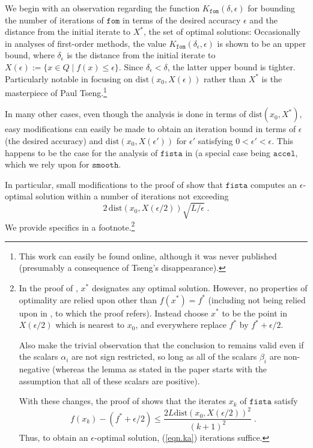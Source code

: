 \documentclass[reqno, 11pt]{amsart}
\numberwithin{equation}{section}
\newcommand{\fom}{\mathtt{fom}}
\newcommand{\accel}{\mathtt{accel}}
\newcommand{\fista}{\mathtt{fista}}
\newcommand{\smooth}{\mathtt{smooth}}
\newcommand{\dist}{\mathrm{dist}}
\begin{document}
We begin with an observation regarding the function $ K_{\fom}(\delta, \epsilon) $ for bounding the number of iterations of $ \fom $ in terms of the desired accuracy $ \epsilon $ and the distance from the initial iterate to $ X^* $, the set of optimal solutions:  Occasionally  in  analyses of first-order methods, the value $ K_{\fom}( \delta_{\epsilon}, \epsilon) $ is shown to be an upper bound, where $ \delta_{\epsilon} $ is the distance from the initial iterate to $ X(\epsilon) := \{ x \in Q \mid f(x) \leq \epsilon \} $. Since $ \delta_{\epsilon} < \delta $, the latter upper bound is tighter.  Particularly notable in focusing on $ \dist(x_0,X(\epsilon)) $ rather than $ X^* $   is the masterpiece \cite{tseng2008accelerated} of Paul Tseng.\footnote{This work can easily be found online, although it was never published (presumably a consequence of Tseng's disappearance).}

In many other cases, even though the analysis is done in terms of $ \dist(x_0,X^*) $, easy modifications can easily be made to obtain an iteration bound in terms of $ \epsilon $ (the desired accuracy) and $ \dist(x_0, X( \epsilon')) $ for $ \epsilon' $ satisfying $ 0 < \epsilon' < \epsilon $. This happens to be the case for the analysis of $ \fista $ in \cite{beck2009fast}  (a special case being $ \accel $, which we rely upon for $ \smooth $. 

In particular, small modifications to the proof of \cite[Thm 4.4]{beck2009fast} show that $ \fista $ computes an $ \epsilon $-optimal solution within a number of iterations not exceeding
\begin{equation}  \label{eqn.ka} 
                      2 \, \dist(x_0,X(\epsilon/2)) \sqrt{L/ \epsilon } \; . 
\end{equation}
We provide specifics in a footnote.\footnote{In the proof of \cite[Thm 4.4]{beck2009fast}, $ x^* $  designates any optimal solution.  However, no properties of optimality are relied upon other than $ f(x^*) = f^* $ (including not being relied upon in \cite[Lemma 4.1]{beck2009fast}, to which the proof refers). Instead choose $ x^* $ to be the point in $ X(\epsilon/2) $ which is nearest to $ x_0 $, and everywhere replace $ f^* $ by $  f^* + \epsilon/ 2 $. 

Also make the trivial observation that the conclusion to \cite[Lemma 4.2]{beck2009fast} remains valid even if the scalars $ \alpha_i $ are not sign restricted, so long as all of the scalars $ \beta_i $ are non-negative (whereas the lemma as stated in the paper starts with the assumption that all of these scalars are positive).     

With these changes, the proof of \cite[Thm 4.4]{beck2009fast}  shows that the iterates $ x_k $ of $ \fista $ satisfy
\[  f(x_k) - (f^* + \epsilon/2)  \leq \frac{2 L \dist(x_0, X(\epsilon/2))^2 }{(k+1)^2} \; . \]
Thus, to obtain an $ \epsilon $-optimal solution, (\ref{eqn.ka}) iterations suffice.}                        
 
\end{document}

